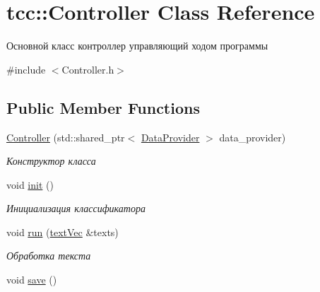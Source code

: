 \hypertarget{classtcc_1_1_controller}{}\section{tcc\+:\+:Controller Class Reference}
\label{classtcc_1_1_controller}


Основной класс контроллер управляющий ходом программы  




{\ttfamily \#include $<$Controller.\+h$>$}

\subsection*{Public Member Functions}
\begin{DoxyCompactItemize}
\item 
\hyperlink{classtcc_1_1_controller_addf3fea20133594d55a03f5134614b98}{Controller} (std\+::shared\+\_\+ptr$<$ \hyperlink{classtcc_1_1_data_provider}{Data\+Provider} $>$ data\+\_\+provider)
\begin{DoxyCompactList}\small\item\em Конструктор класса \end{DoxyCompactList}\item 
void \hyperlink{classtcc_1_1_controller_a61233522bd4c1a17dddb76f7f337bf3a}{init} ()\hypertarget{classtcc_1_1_controller_a61233522bd4c1a17dddb76f7f337bf3a}{}\label{classtcc_1_1_controller_a61233522bd4c1a17dddb76f7f337bf3a}

\begin{DoxyCompactList}\small\item\em Инициализация классификатора \end{DoxyCompactList}\item 
void \hyperlink{classtcc_1_1_controller_a41b047e081c2ae0350379b5d84e5d2a3}{run} (\hyperlink{namespacetcc_a9bdf9e81347b7904a6a7f8427d6465dc}{text\+Vec} \&texts)\hypertarget{classtcc_1_1_controller_a41b047e081c2ae0350379b5d84e5d2a3}{}\label{classtcc_1_1_controller_a41b047e081c2ae0350379b5d84e5d2a3}

\begin{DoxyCompactList}\small\item\em Обработка текста \end{DoxyCompactList}\item 
void \hyperlink{classtcc_1_1_controller_a957db61db1243fb15d8de927bfa90388}{save} ()\hypertarget{classtcc_1_1_controller_a957db61db1243fb15d8de927bfa90388}{}\label{classtcc_1_1_controller_a957db61db1243fb15d8de927bfa90388}


\end{DoxyCompactItemize}
